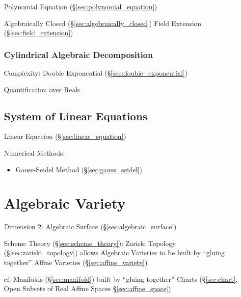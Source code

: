 Polynomial Equation (\S\ref{sec:polynomial_equation})

Algebraically Closed (\S\ref{sec:algebraically_closed}) Field
Extension (\S\ref{sec:field_extension})



\subsubsection{Cylindrical Algebraic Decomposition}
\label{sec:algebraic_decomposition}

Complexity: Double Exponential (\S\ref{sec:double_exponential})

Quantification over Reals



\subsection{System of Linear Equations}
\label{sec:system_of_linear_equations}

Linear Equation (\S\ref{sec:linear_equation})

Numerical Methods:
\begin{itemize}
  \item Gauss-Seidel Method (\S\ref{sec:gauss_seidel})
\end{itemize}



\section{Algebraic Variety}\label{sec:algebraic_variety}

Dimension 2: Algebraic Surface (\S\ref{sec:algebraic_surface})

Scheme Theory (\S\ref{sec:scheme_theory}): Zariski Topology
(\S\ref{sec:zariski_topology}) allows Algebraic Varieties to be built by
``gluing together'' Affine Varieties (\S\ref{sec:affine_variety})

cf. Manifolds (\S\ref{sec:manifold}) built by ``gluing together'' Charts
(\S\ref{sec:chart}, Open Subsets of Real Affine Spaces
\S\ref{sec:affine_space})





